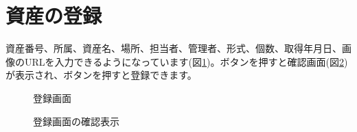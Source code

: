 \documentclass[11ptm]{jsarticle}
\begin{document}
\clearpage
\section{資産の登録}
\label{sec:資産の登録}
資産番号、所属、資産名、場所、担当者、管理者、形式、個数、取得年月日、画像のURLを入力できるようになっています(図\ref{fig:登録画面})。ボタンを押すと確認画面(図\ref{fig:登録画面の確認表示})が表示され、ボタンを押すと登録できます。\par
\begin{figure}[h]
  \centering
  \caption{\label{fig:登録画面}登録画面}
\end{figure}
\begin{figure}[h]
  \centering
  \caption{\label{fig:登録画面の確認表示}登録画面の確認表示}
\end{figure}


\clearpage
\end{document}
